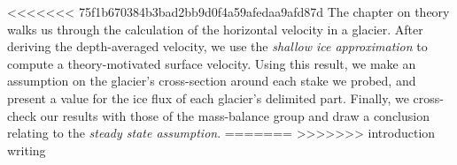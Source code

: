 <<<<<<< 75f1b670384b3bad2bb9d0f4a59afedaa9afd87d
The chapter on theory walks us through the calculation of the horizontal velocity in a glacier. After deriving the depth-averaged velocity, we use the \textit{shallow ice approximation} to compute a theory-motivated surface velocity. Using this result, we make an assumption on the glacier's cross-section around each stake we probed, and present a value for the ice flux of each glacier's delimited part. Finally, we cross-check our results with those of the mass-balance group and draw a conclusion relating to the \textit{steady state assumption}.
=======
>>>>>>> introduction writing

